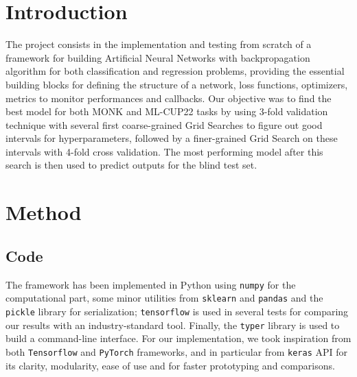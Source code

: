 \section{Introduction}

The project consists in the implementation and testing from scratch of a framework for building Artificial Neural Networks with backpropagation algorithm for both classification and regression problems, providing the essential building blocks for defining the structure of a network, loss functions, optimizers, metrics to monitor performances and callbacks. Our objective was to find the best model for both MONK \cite{Thrun1991TheMP} and ML-CUP22 tasks by using 3-fold validation technique with several first coarse-grained Grid Searches to figure out good intervals for hyperparameters, followed by a finer-grained Grid Search on these intervals with 4-fold cross validation. The most performing model after this search is then used to predict outputs for the blind test set.

\section{Method}

\subsection{Code}

The framework has been implemented in Python using \texttt{numpy} for the computational part, some minor utilities from \texttt{sklearn} and \texttt{pandas} and the \texttt{pickle} library for serialization; \texttt{tensorflow} is used in several tests for comparing our results with an industry-standard tool.
Finally, the \texttt{typer} library is used to build a command-line interface.
For our implementation, we took inspiration from both \texttt{Tensorflow} and \texttt{PyTorch} frameworks, and in particular from \texttt{keras} API for its clarity, modularity, ease of use and for faster prototyping and comparisons.

\paragraph{}

